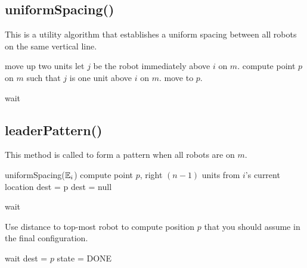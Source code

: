 \documentclass[preprint,10pt]{elsarticle}
\begin{document}
\subsection{uniformSpacing()} 
This is a utility algorithm that establishes a uniform spacing between all robots on
the same vertical line.
\begin{algorithm}[H]
\begin{algorithmic}[1]
		\State move up two units
	\EndIf
	\State let $j$ be the robot immediately above $i$ on $m$.
	\State compute point $p$ on $m$ such that $j$ is one
	unit above $i$ on $m$.
	\State move to $p$.

		\State wait
	\EndWhile
\EndProcedure
\end{algorithmic}
\end{algorithm}

\subsection{leaderPattern()} 
This method is called to form a pattern when all robots are on $m$.
\begin{algorithm}[H]
\begin{algorithmic}[1]

	uniformSpacing($\mathbb{E}_i$) %
		\State compute point $p$, right $(n-1)$ units from $i$'s current location
		\State dest = p
	\Else
		dest = null
	\EndIf

		\State wait
	\EndWhile

	\State Use distance to top-most robot to compute position $p$ that you
	should assume in the final configuration.

		\State wait
	\EndWhile
	\State dest = $p$
	\State state = DONE


\EndProcedure
\end{algorithmic}
\end{algorithm}

 

\end{document}
